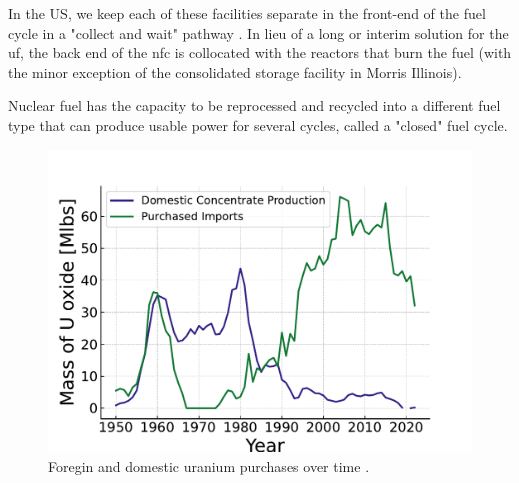 

In the US, we keep each of these facilities separate in the front-end of
the fuel cycle in a "collect and wait" pathway \cite{cycle_risks}. In
lieu of a long or interim solution for the \gls{uf}, the back end of the
\gls{nfc} is collocated with the reactors that burn the fuel (with the
minor exception of the consolidated storage facility in Morris Illinois).

Nuclear fuel has the capacity to be
reprocessed and recycled into a different fuel type that can produce
usable power for several cycles, called a "closed" fuel cycle.





 \begin{figure}[h]
    \centering
    \includegraphics[scale=0.8]{images/intro/uranium_production_imports.pdf}
    \caption{Foregin and domestic uranium purchases over time \cite{eia_monthly_energy_review_2024}.}
    \label{fig:foregin_u3o8}
 \end{figure}